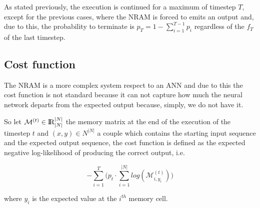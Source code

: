 As stated previously, the execution is continued for a maximum of timestep $T$, except for the previous cases, where the NRAM is forced to emits an output and, due to this, the probability to terminate is $p_{T} = 1 - \sum\limits_{i=1}^{T-1}p_{i}$ regardless of the $f_{T}$ of the last timestep.

\subsection{Cost function}
The NRAM is a more complex system respect to an ANN and due to this the cost function is not standard because it can not capture how much the neural network departs from the expected output because, simply, we do not have it. 

So let $\mathcal{M}^{(t)} \in \textrm{I\!R}^{|N|}_{|N|}$ the memory matrix at the end of the execution of the timestep $t$ and $(x, y) \in N^{|N|}$ a couple which contains the starting input sequence and the expected output sequence, the cost function is defined as the expected negative log-likelihood of producing the correct output, i.e.
\begin{center}
	\begin{equation}
		-\sum\limits_{i=1}^{T}\Bigg(p_{t}\cdot\sum\limits_{i=1}^{|N|}log(\mathcal{M}_{i, y_{i}}^{(t)})\Bigg)
	\end{equation}
\end{center}
where $y_i$ is the expected value at the $i^{th}$ memory cell.